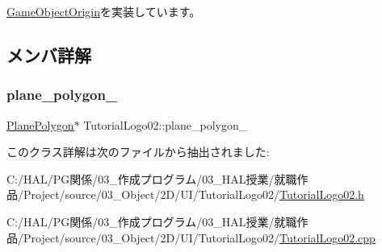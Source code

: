 \mbox{\hyperlink{class_game_object_origin_aeac8fc4a1f625982313a9a60dd35d016}{Game\+Object\+Origin}}を実装しています。



\subsection{メンバ詳解}
\mbox{\label{class_tutorial_logo02_a4d43a653ba9425cade8a85acc5c299f8}} 
\subsubsection{\texorpdfstring{plane\+\_\+polygon\+\_\+}{plane\_polygon\_}}
{\footnotesize\ttfamily \mbox{\hyperlink{class_plane_polygon}{Plane\+Polygon}}$\ast$ Tutorial\+Logo02\+::plane\+\_\+polygon\+\_\+}



このクラス詳解は次のファイルから抽出されました\+:\begin{DoxyCompactItemize}
\item 
C\+:/\+H\+A\+L/\+P\+G関係/03\+\_\+作成プログラム/03\+\_\+\+H\+A\+L授業/就職作品/\+Project/source/03\+\_\+\+Object/2\+D/\+U\+I/\+Tutorial\+Logo02/\mbox{\hyperlink{_tutorial_logo02_8h}{Tutorial\+Logo02.\+h}}\item 
C\+:/\+H\+A\+L/\+P\+G関係/03\+\_\+作成プログラム/03\+\_\+\+H\+A\+L授業/就職作品/\+Project/source/03\+\_\+\+Object/2\+D/\+U\+I/\+Tutorial\+Logo02/\mbox{\hyperlink{_tutorial_logo02_8cpp}{Tutorial\+Logo02.\+cpp}}\end{DoxyCompactItemize}
